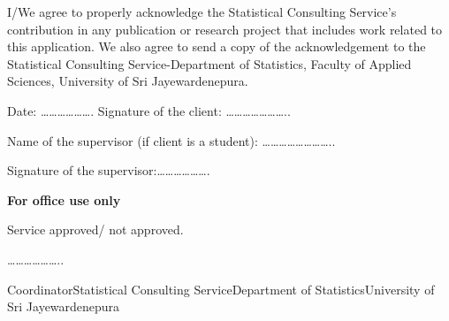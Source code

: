 \documentclass[
  a4paper]{article}
\begin{document}
I/We agree to properly acknowledge the Statistical Consulting Service's
contribution in any publication or research project that includes work
related to this application. We also agree to send a copy of the
acknowledgement to the Statistical Consulting Service-Department of
Statistics, Faculty of Applied Sciences, University of Sri
Jayewardenepura.

\vspace{0.5cm}

Date: \ldots\ldots\ldots\ldots\ldots\ldots. \hspace{2cm} Signature of
the client: \ldots\ldots\ldots\ldots\ldots\ldots\ldots..

\vspace{1cm}

Name of the supervisor (if client is a student):
\ldots\ldots\ldots\ldots\ldots\ldots\ldots\ldots..

\vspace{0.5cm}

Signature of the supervisor:\ldots\ldots\ldots\ldots\ldots\ldots.

\noindent\makebox[\linewidth]{\rule{\paperwidth}{0.4pt}}

\textbf{For office use only}

Service approved/ not approved.

\hspace{2cm}

\ldots\ldots\ldots\ldots\ldots\ldots..

Coordinator\newline Statistical Consulting Service\newline Department of
Statistics\newline University of Sri Jayewardenepura
\end{document}
